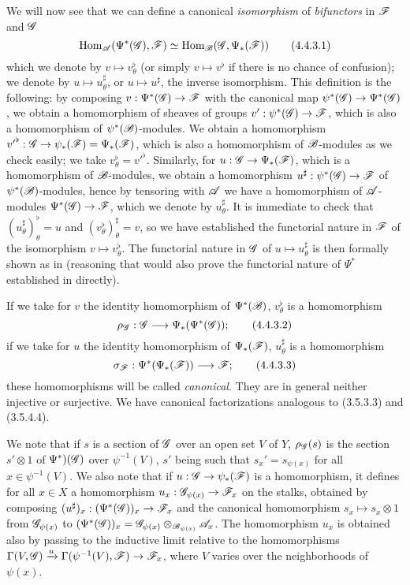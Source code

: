 \begin{env}[4.4.3]
\label{0.4.4.3}
We will now see that we can define a canonical \emph{isomorphism} of \emph{bifunctors} in
$\mathscr{F}$ and $\mathscr{G}$
\[
  {\mathop{\mathrm{Hom}}\nolimits}_\mathscr{A}(\Psi^*(\mathscr{G}),\mathscr{F})\simeq{\mathop{\mathrm{Hom}}\nolimits}_\mathscr{B}(\mathscr{G},\Psi_*(\mathscr{F}))
  \tag{4.4.3.1}
\]
which we denote by $v\mapsto v_\theta^\flat$ (or simply $v\mapsto v^\flat$ if there is no
chance of confusion); we denote by $u\mapsto u_\theta^\sharp$, or $u\mapsto u^\sharp$, the
inverse isomorphism. This definition is the following: by composing
$v:\Psi^*(\sh{G})\to\sh{F}$ with the canonical map $\psi^*(\sh{G})\to\Psi^*(\sh{G})$, we
obtain a homomorphism of sheaves of groups $v':\psi^*(\sh{G})\to\sh{F}$, which is also a
homomorphism of $\psi^*(\mathscr{B})$-modules. We obtain  a homomorphism
${v'}^\flat:\sh{G}\to\psi_*(\sh{F})=\Psi_*(\sh{F})$, which is also a homomorphism of
$\mathscr{B}$-modules as we
check easily; we take $v_\theta^\flat={v'}^\flat$. Similarly, for
$u:\sh{G}\to\Psi_*(\sh{F})$, which is a homomorphism of $\mathscr{B}$-modules, we obtain
 a homomorphism $u^\sharp:\psi^*(\sh{G})\to\sh{F}$ of
$\psi^*(\mathscr{B})$-modules, hence by tensoring with $\mathscr{A}$ we have a homomorphism of
$\mathscr{A}$-modules $\Psi^*(\sh{G})\to\sh{F}$, which we denote by $u_\theta^\sharp$. It is
immediate to check that $(u_\theta^\sharp)_\theta^\flat=u$ and
$(v_\theta^\flat)_\theta^\sharp=v$, so we have established the functorial nature in $\mathscr{F}$
of the isomorphism $v\mapsto v_\theta^\flat$. The functorial nature in $\mathscr{G}$ of
$u\mapsto u_\theta^\sharp$ is then formally shown as in  (reasoning that
would also prove the functorial nature of $\Psi^*$ established in 
directly).

If we take for $v$ the identity homomorphism of $\Psi^*(\mathscr{B})$, $v_\theta^\flat$ is a
homomorphism
\[
  \rho_\sh{G}:\sh{G}\to\Psi_*(\Psi^*(\sh{G}));
  \tag{4.4.3.2}
\]
if we take for $u$ the identity homomorphism of $\Psi_*(\mathscr{F})$, $u_\theta^\sharp$ is a
homomorphism
\[
  \sigma_\sh{F}:\Psi^*(\Psi_*(\sh{F}))\to\sh{F};
  \tag{4.4.3.3}
\]
these homomorphisms will be called \emph{canonical}. They are in general neither injective or
surjective. We have canonical factorizations analogous to (3.5.3.3) and (3.5.4.4).

We note that if $s$ is a section of $\mathscr{G}$ over an open set $V$ of $Y$, $\rho_\mathscr{G}(s)$ is
the section $s'\otimes 1$ of $\Psi^*)(\mathscr{G})$ over $\psi^{-1}(V)$, $s'$ being such that
$s_x'=s_{\psi(x)}$ for all $x\in\psi^{-1}(V)$. We also note that if
$u:\sh{G}\to\psi_*(\sh{F})$ is a homomorphism, it defines for all $x\in X$ a homomorphism
$u_x:\sh{G}_{\psi(x)}\to\sh{F}_x$ on the stalks, obtained by composing
$(u^\sharp)_x:(\Psi^*(\sh{G}))_x\to\sh{F}_x$ and the canonical homomorphism
$s_x\mapsto s_x\otimes 1$ from $\mathscr{G}_{\psi(x)}$ to
$(\Psi^*(\mathscr{G}))_x=\mathscr{G}_{\psi(x)}\otimes_{\mathscr{B}_{\psi(x)}}\mathscr{A}_x$. The homomorphism
$u_x$ is obtained also by passing to the inductive limit relative to the homomorphisms
$\Gamma(V,\sh{G})\xrightarrow{u}\Gamma(\psi^{-1}(V),\sh{F})\to\sh{F}_x$, where $V$ varies
over the neighborhoods of $\psi(x)$.
\end{env}

